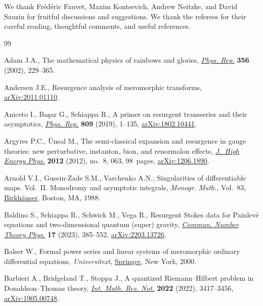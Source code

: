 \documentclass[pdftex]{sigma}
\numberwithin{equation}{section}
\begin{document}
We thank Fr\'ed\'eric Fauvet, Maxim Kontsevich, Andrew Neitzke, and David Sauzin for fruitful discussions and suggestions. We thank the referees for their careful reading, thoughtful comments, and useful references.

\begin{thebibliography}{99}
\footnotesize\itemsep=0pt

Adam J.A., The mathematical physics of rainbows and glories,
 \href{https://doi.org/10.1016/S0370-1573(01)00076-X}{\textit{Phys. Rep.}}
 \textbf{356} (2002), 229--365.

Andersen J.E., Resurgence analysis of meromorphic transforms,
 \href{http://arxiv.org/abs/2011.01110}{arXiv:2011.01110}.

Aniceto I., Ba\c{s}ar G., Schiappa R., A primer on resurgent transseries and
 their asymptotics,
 \href{https://doi.org/10.1016/j.physrep.2019.02.003}{\textit{Phys. Rep.}}
 \textbf{809} (2019), 1--135,
 \href{http://arxiv.org/abs/1802.10441}{arXiv:1802.10441}.

Argyres P.C., \"Unsal M., The semi-classical expansion and resurgence in gauge
 theories: new perturbative, instanton, bion, and renormalon effects,
 \href{https://doi.org/10.1007/JHEP08(2012)063}{\textit{J.~High Energy Phys.}}
 \textbf{2012} (2012), no.~8, 063, 98~pages,
 \href{http://arxiv.org/abs/1206.1890}{arXiv:1206.1890}.

Arnold V.I., Gusein-Zade S.M., Varchenko A.N., Singularities of differentiable
 maps. {V}ol.~{II}. {M}onodromy and asymptotic integrals, \textit{Monogr.
 Math.}, Vol.~83,
 \href{https://doi.org/10.1007/978-1-4612-3940-6}{Birkh\"auser}, Boston, MA,
 1988.

Baldino S., Schiappa R., Schwick M., Vega R., Resurgent {S}tokes data for
 {P}ainlev\'e equations and two-dimensional quantum (super) gravity,
 \href{https://doi.org/10.4310/cntp.2023.v17.n2.a5}{\textit{Commun. Number
 Theory Phys.}} \textbf{17} (2023), 385--552,
 \href{http://arxiv.org/abs/2203.13726}{arXiv:2203.13726}.

Balser W., Formal power series and linear systems of meromorphic ordinary
 differential equations, \textit{Universitext},
 \href{https://doi.org/10.1007/b97608}{Springer}, New York, 2000.

Barbieri A., Bridgeland T., Stoppa J., A quantized {R}iemann--{H}ilbert problem
 in {D}onaldson--{T}homas theory,
 \href{https://doi.org/10.1093/imrn/rnaa294}{\textit{Int. Math. Res. Not.}}
 \textbf{2022} (2022), 3417--3456,
 \href{http://arxiv.org/abs/1905.00748}{arXiv:1905.00748}.


\end{thebibliography}
\end{document}
